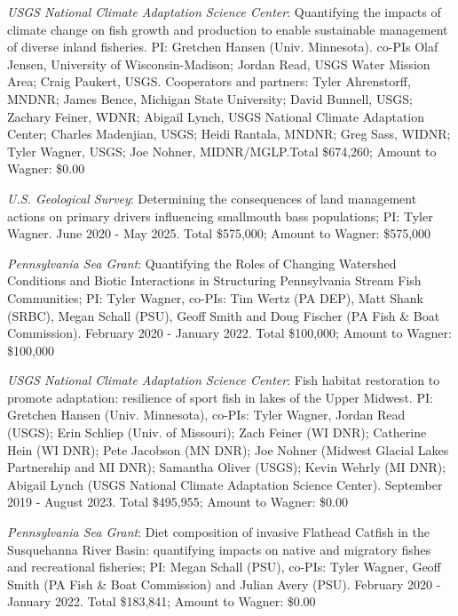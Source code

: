 \documentclass[10pt]{article}
\begin{document}
\begin{flushleft}
\begin{etaremune}
\item {\sl USGS National Climate Adaptation Science Center}: Quantifying the impacts of climate change on fish growth and production to enable sustainable management of diverse inland fisheries. PI: Gretchen Hansen (Univ. Minnesota). co-PIs Olaf Jensen, University of Wisconsin-Madison; Jordan Read, USGS Water Mission Area; Craig Paukert, USGS. Cooperators and partners: Tyler Ahrenstorff, MNDNR; James Bence, Michigan State University; David Bunnell, USGS; Zachary Feiner, WDNR; Abigail Lynch, USGS National Climate Adaptation Center; Charles Madenjian, USGS; Heidi Rantala, MNDNR; Greg Sass, WIDNR; Tyler Wagner, USGS; Joe Nohner, MIDNR/MGLP.Total \$674,260; Amount to Wagner: \$0.00

\item {\sl U.S. Geological Survey}: Determining the consequences of land management actions on primary drivers influencing smallmouth bass populations; PI: Tyler Wagner. June 2020 - May 2025. Total \$575,000; Amount to Wagner: \$575,000

\item {\sl Pennsylvania Sea Grant}: Quantifying the Roles of Changing Watershed Conditions and Biotic Interactions in Structuring Pennsylvania Stream Fish Communities; PI: Tyler Wagner, co-PIs: Tim Wertz (PA DEP), Matt Shank (SRBC), Megan Schall (PSU), Geoff Smith and Doug Fischer (PA Fish \& Boat Commission). February 2020 - January 2022. Total \$100,000; Amount to Wagner: \$100,000

\item  {\sl USGS National Climate Adaptation Science Center}: Fish habitat restoration to promote adaptation: resilience of sport fish in lakes of the Upper Midwest. PI: Gretchen Hansen (Univ. Minnesota), co-PIs: Tyler Wagner, Jordan Read (USGS); Erin Schliep (Univ. of Missouri); Zach Feiner (WI DNR); Catherine Hein (WI DNR); Pete Jacobson (MN DNR); Joe Nohner (Midwest Glacial Lakes Partnership and MI DNR); Samantha Oliver (USGS); Kevin Wehrly (MI DNR); Abigail Lynch (USGS National Climate Adaptation Science Center). September 2019 - August 2023. Total \$495,955; Amount to Wagner: \$0.00

\item  {\sl Pennsylvania Sea Grant}: Diet composition of invasive Flathead Catfish in the Susquehanna River Basin: quantifying impacts on native and migratory fishes and recreational fisheries; PI: Megan Schall (PSU), co-PIs: Tyler Wagner, Geoff Smith (PA Fish \& Boat Commission) and Julian Avery (PSU). February 2020 - January 2022. Total \$183,841; Amount to Wagner: \$0.00


\end{etaremune}
\end{flushleft}
\end{document}
